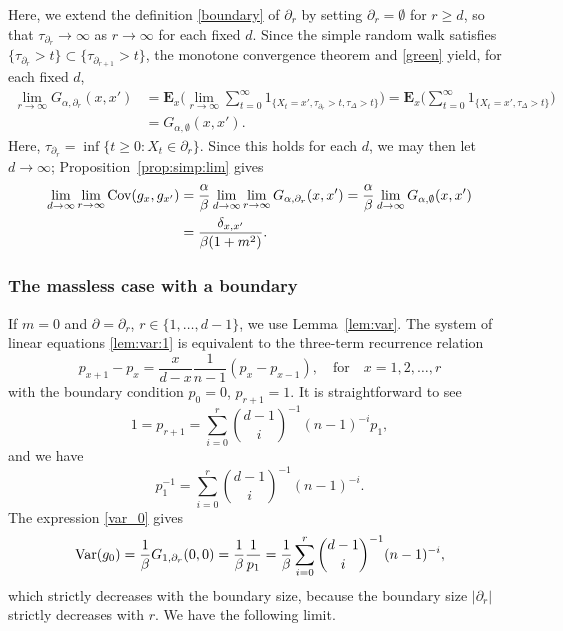 \documentclass[a4paper,11pt]{article}
\theoremstyle{plain}
\theoremstyle{definition}
\begin{document}
Here, we extend the definition \eqref{boundary} of
$\partial_r$ by setting $\partial_r=\emptyset$ for
$r\ge d$, so that $\tau_{\partial_r}\to\infty$ as
$r\to\infty$ for each fixed $d$. Since the simple
random walk satisfies
$\{\tau_{\partial_r}>t\}\subset\{\tau_{\partial_{r+1}}>t\}$,
the monotone convergence theorem and \eqref{green} yield,
for each fixed $d$,
\begin{align*}
  \lim_{r\to\infty}
  G_{\alpha,\partial_r}(x,x')&=
  \mathbf{E}_x\Big(\lim_{r\to\infty}
  \sum_{t=0}^\infty1_{\{X_t=x',\tau_{\partial_r}>t,\tau_{\Delta}>t\}}\Big)
  =\mathbf{E}_x\Big(
  \sum_{t=0}^\infty1_{\{X_t=x',\tau_{\Delta}>t\}}\Big)\\
  &=G_{\alpha,\emptyset}(x,x').
\end{align*}
Here, $\tau_{\partial_r}=\inf\{t\ge 0:X_t\in\partial_r\}$.
Since this holds for each $d$, we may then let $d\to\infty$;
Proposition~\ref{prop:simp:lim} gives
\begin{align}
  \lim_{d\to\infty}\lim_{r\to\infty}{\rm Cov}(g_x,g_{x'})
  &=\frac{\alpha}{\beta}\lim_{d\to\infty}
  \lim_{r\to\infty}G_{\alpha,\partial_r}(x,x')
  =\frac{\alpha}{\beta}\lim_{d\to\infty}
  G_{\alpha,\emptyset}(x,x')\nonumber\\
  &=\frac{\delta_{x,x'}}{\beta(1+m^2)}.\label{cov:simp_m}
\end{align}

\subsubsection{The massless case with a boundary}

If $m=0$ and $\partial=\partial_r$, $r\in\{1,\ldots,d-1\}$,
we use Lemma~\ref{lem:var}. The system of linear equations
\eqref{lem:var:1} is equivalent to the three-term recurrence
relation
\[
  p_{x+1}-p_x=\frac{x}{d-x}\frac{1}{n-1}(p_x-p_{x-1}),
  \quad \text{for} \quad x=1,2,\ldots,r
\]
with the boundary condition $p_0=0$, $p_{r+1}=1$.
It is straightforward to see
\[
  1=p_{r+1}=\sum_{i=0}^r {d-1 \choose i}^{-1}(n-1)^{-i}p_1,
\]
and we have
\[
  p_1^{-1}=\sum_{i=0}^r{d-1 \choose i}^{-1}(n-1)^{-i}.
\]
The expression \eqref{var_0} gives
\begin{equation}\label{var:simp_0}
  {\rm Var}(g_0)
  =\frac{1}{\beta}G_{1,\partial_r}(0,0)
  =\frac{1}{\beta}\frac{1}{p_1}
  =\frac{1}{\beta}\sum_{i=0}^r{d-1\choose i}^{-1}(n-1)^{-i},
\end{equation}
which strictly decreases with the boundary size, because
the boundary size $|\partial_r|$ strictly decreases with $r$.
We have the following limit.
\end{document}
